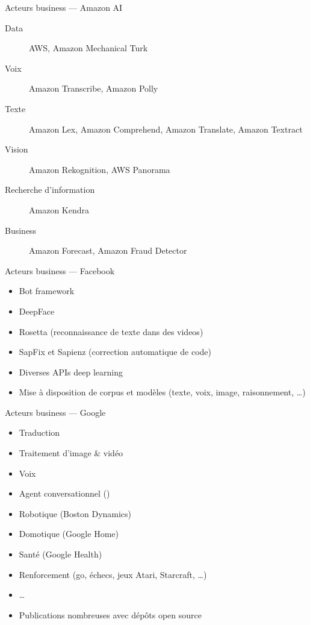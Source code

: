 \begin{frame}{Acteurs business --- Amazon AI}
  \begin{description}
    \item[Data] AWS, Amazon Mechanical Turk
    \item[Voix] Amazon Transcribe, Amazon Polly
    \item[Texte] Amazon Lex, Amazon Comprehend, Amazon Translate, Amazon Textract
    \item[Vision] Amazon Rekognition, AWS Panorama
    \item[Recherche d'information] Amazon Kendra
    \item[Business] Amazon Forecast, Amazon Fraud Detector
  \end{description}
\end{frame}

\begin{frame}{Acteurs business --- Facebook}
  \begin{itemize}
  \item Bot framework
  \item DeepFace
  \item Rosetta (reconnaissance de texte dans des videos)
  \item SapFix et Sapienz (correction automatique de code)
  \item Diverses APIs deep learning
  \item Mise à disposition de corpus et modèles (texte, voix, image, raisonnement, …)
  \end{itemize}
\end{frame}

\begin{frame}{Acteurs business --- Google}
  \begin{itemize}
  \item Traduction
  \item Traitement d'image \& vidéo
  \item Voix
  \item Agent conversationnel ()
  \item Robotique (Boston Dynamics)
  \item Domotique (Google Home)
  \item Santé (Google Health)
  \item Renforcement (go, échecs, jeux Atari, Starcraft, …)
  \item …
  \item Publications nombreuses avec dépôts open source
  \end{itemize}
\end{frame}

